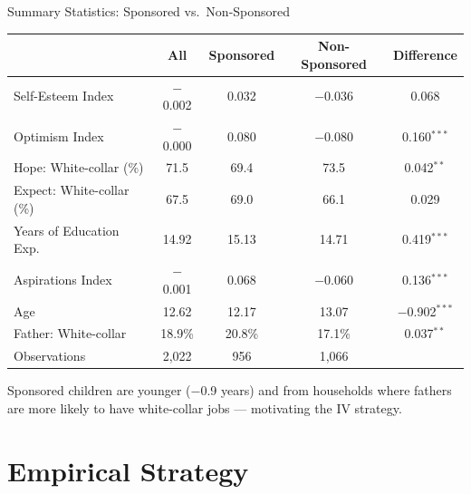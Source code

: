 \documentclass[aspectratio=169, 10pt]{beamer}
\begin{document}
\begin{frame}{Summary Statistics: Sponsored vs.\ Non-Sponsored}
  \begin{center}
  \small
  \begin{tabular}{lcccc}
    \toprule
    & \textbf{All} & \textbf{Sponsored} & \textbf{Non-Sponsored} & \textbf{Difference} \\
    \midrule
    Self-Esteem Index  & $-$0.002 & 0.032  & $-$0.036 & 0.068 \\
    Optimism Index     & $-$0.000 & 0.080  & $-$0.080 & 0.160$^{***}$ \\
    Hope: White-collar (\%) & 71.5 & 69.4 & 73.5 & 0.042$^{**}$ \\
    Expect: White-collar (\%) & 67.5 & 69.0 & 66.1 & 0.029 \\
    Years of Education Exp.\ & 14.92 & 15.13 & 14.71 & 0.419$^{***}$ \\
    Aspirations Index  & $-$0.001 & 0.068  & $-$0.060 & 0.136$^{***}$ \\
    Age                & 12.62 & 12.17 & 13.07 & $-$0.902$^{***}$ \\
    Father: White-collar & 18.9\% & 20.8\% & 17.1\% & 0.037$^{**}$ \\
    \midrule
    Observations       & 2,022 & 956 & 1,066 & \\
    \bottomrule
  \end{tabular}
  \end{center}
  \vspace{0.2em}
  {\small \color{medgray} Sponsored children are younger ($-$0.9 years) and from households where fathers are more likely to have white-collar jobs --- motivating the IV strategy.}
\end{frame}

\section{Empirical Strategy}
\end{document}
